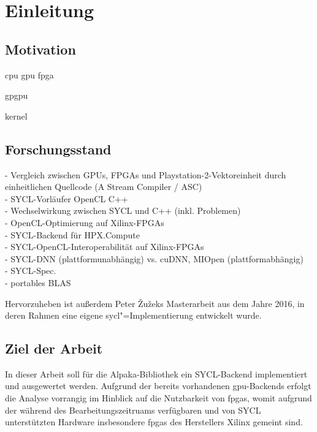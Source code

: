 \chapter{Einleitung}\label{einleitung}

\section{Motivation}\label{einleitung:motivation}

\gls{cpu}
\gls{gpu}
\gls{fpga}

\gls{gpgpu}

\gls{kernel}

\section{Forschungsstand}\label{einleitung:forschung}

\cite{howes2006} - Vergleich zwischen GPUs, FPGAs und Playstation-2-Vektoreinheit durch einheitlichen Quellcode (A Stream Compiler / ASC) \\
\cite{gaster2013} - SYCL-Vorläufer OpenCL C++ \\
\cite{wong2016} - Wechselwirkung zwischen SYCL und C++ (inkl. Problemen) \\
\cite{fifield2016} - OpenCL-Optimierung auf Xilinx-FPGAs \\
\cite{copik2017} - SYCL-Backend für HPX.Compute\\
\cite{doumoulakis2017} - SYCL-OpenCL-Interoperabilität auf Xilinx-FPGAs \\
\cite{burns2019} - SYCL-DNN (plattformunabhängig) vs. cuDNN, MIOpen (plattformabhängig) \\
\cite{sycl2019} - SYCL-Spec.\\
\cite{rodriguez-gutiez2019} - portables BLAS

Hervorzuheben ist außerdem Peter Žužeks Masterarbeit aus dem Jahre 2016, in
deren Rahmen eine eigene \gls{sycl}"=Implementierung entwickelt wurde. \cite{zuzek2016}

\section{Ziel der Arbeit}\label{einleitung:ziel}

In dieser Arbeit soll für die Alpaka-Bibliothek ein SYCL-Backend implementiert
und ausgewertet werden. Aufgrund der bereits vorhandenen \gls{gpu}-Backends
erfolgt die Analyse vorrangig im Hinblick auf die Nutzbarkeit von \gls{fpga}s,
womit aufgrund der während des Bearbeitungszeitruams verfügbaren und von SYCL
unterstützten Hardware insbesondere \gls{fpga}s des Herstellers Xilinx gemeint
sind.
